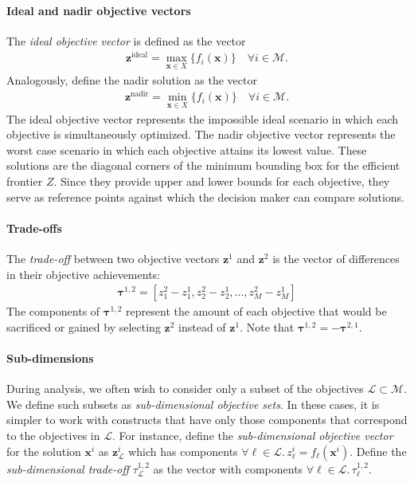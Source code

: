 \paragraph{Ideal and nadir objective vectors}
The \textit{ideal objective vector} is defined as the vector
\begin{align}
\mathbf{z}^{\text{ideal}} = \max_{\mathbf{x} \in X}\{f_i(\mathbf{x})\} \quad \forall i \in \mathcal{M}.
\end{align}
Analogously, define the nadir solution as the vector
\begin{align}
\mathbf{z}^{\text{nadir}} = \min_{\mathbf{x} \in X}\{f_i(\mathbf{x})\} \quad \forall i \in \mathcal{M}.
\end{align}
The ideal objective vector represents the impossible ideal scenario in which each objective is simultaneously optimized. The nadir objective vector represents the worst case scenario in which each objective attains its lowest value. These solutions are the diagonal corners of the minimum bounding box for the efficient frontier $Z$. Since they provide upper and lower bounds for each objective, they serve as reference points against which the decision maker can compare solutions. 

\paragraph{Trade-offs}
The \textit{trade-off} between two objective vectors $\mathbf{z}^1$ and $\mathbf{z}^2$ is the vector of differences in their objective achievements:
\begin{align}
\mathbf{\tau}^{1,2} = [z^2_1 - z^1_1, z^2_2 - z^1_2, \ldots, z^2_M - z^1_M]
\end{align}
The components of $\mathbf{\tau}^{1,2}$ represent the amount of each objective that would be sacrificed or gained by selecting $\mathbf{z}^2$ instead of $\mathbf{z}^1$.
Note that $\mathbf{\tau}^{1,2} = - \mathbf{\tau}^{2,1}$. 

\paragraph{Sub-dimensions}
During analysis, we often wish to consider only a subset of the objectives $\mathcal{L} \subset\mathcal{M}$. We define such subsets as \textit{sub-dimensional objective sets}. In these cases, it is simpler to work with constructs that have only those components that correspond to the objectives in $\mathcal{L}$. For instance, define the \textit{sub-dimensional objective vector} for the solution $\mathbf{x}^i$ as $\mathbf{z}^i_\mathcal{L}$ which has components $\forall \ell \in \mathcal{L}. \, z^i_\ell = f_\ell(\mathbf{x}^i)$.
Define the \textit{sub-dimensional trade-off} $\tau^{1,2}_\mathcal{L}$ as the vector with components $\forall \ell \in \mathcal{L}. \, \tau^{1,2}_\ell$.

